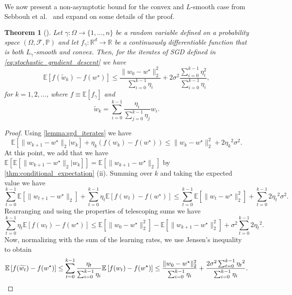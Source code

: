 \documentclass[12pt]{article}
\newtheorem{theorem}{Theorem}[section]
\theoremstyle{definition}
\numberwithin{equation}{section}
\newcommand{\R}{\mathbb{R}}
\newcommand{\E}{\mathbb{E}}
\newcommand{\BP}{\mathbb{P}}
\newcommand{\CF}{\mathcal{F}}
\newcommand{\ev}[1]{\mathbb{E}\left[{#1}\right]}
\newcommand{\norm}[1]{\lVert{#1}\rVert_2}
\begin{document}
We now present a non-asymptotic bound for the convex and $L$-smooth case from Sebbouh et al.\ \cite{sebbouhAlmostSureConvergence2021} and expand on some details of the proof.
\begin{theorem}[]
  \label{thm:SGD_bound}
  Let $\gamma : \Omega \rightarrow \{1,\dots,n\}$ be a random variable defined on a probability space $(\Omega, \CF, \BP)$ and let $f_{\gamma} : \R^d \rightarrow \R$ be a continuously differentiable function that is both $L_{\gamma}$-smooth and convex. Then, for the iterates of SGD defined in \eqref{eq:stochastic_gradient_descent} we have
  \begin{equation*}
    \ev{f(\widetilde{w}_k) - f(w^\star)} \leq \frac{\norm{w_{0} - w^\star}^2}{\sum_{i=0}^{k-1}\eta_i} + 2 \sigma^2 \frac{\sum_{i=0}^{k-1}\eta_i^2}{\sum_{i=0}^{k-1}\eta_i},
  \end{equation*}
  for $k = 1, 2, \dots$, where $f \equiv \ev{f_\gamma}$ and
  \begin{equation*}
    \widetilde{w}_k = \sum_{i=0}^{k-1}\frac{\eta_i}{\sum_{j=0}^{k-1}\eta_j}w_i.
  \end{equation*}
\end{theorem}
\begin{proof}
  Using \autoref{lemma:sgd_iterates} we have
  \begin{equation*}
    \E[\norm{w_{k+1} - w^\star}|w_k] + \eta_k (f(w_{k}) - f(w^\star)) \leq \norm{w_{k} - w^\star}^2 + 2{\eta_k}^2\sigma^2.
  \end{equation*}
  At this point, we add that we have $\ev{\E[\norm{w_{k+1} - w^\star}|w_k]} = \ev{\norm{w_{k+1} - w^\star}}$ by \autoref{thm:conditional_expectation} (ii).
  Summing over $k$ and taking the expected value we have
  \begin{equation*}
    \sum_{t=0}^{k-1}\ev{\norm{w_{t+1} - w^\star}} + \sum_{t=0}^{k-1} \eta_t \ev{f(w_{t}) - f(w^\star)} \leq \sum_{t=0}^{k-1} \ev{\norm{w_{t} - w^\star}^2} + \sum_{t=0}^{k-1} 2{\eta_t}^2\sigma^2.
  \end{equation*}
  Rearranging and using the properties of telescoping sums we have
  \begin{equation*}
    \sum_{t=0}^{k-1} \eta_t \ev{f(w_{t}) - f(w^\star)} \leq \ev{\norm{w_{0} - w^\star}^2} - \ev{\norm{w_{k+1} - w^\star}^2} + \sigma^2\sum_{t=0}^{k-1} 2{\eta_t}^2.
  \end{equation*}
  Now, normalizing with the sum of the learning rates, we use Jensen's inequality to obtain
  \begin{equation*}
    \ev{f(\widetilde{w_{t}}) - f(w^\star)} \leq \sum_{t=0}^{k-1} \frac{\eta_t}{\sum_{i=0}^{k-1}\eta_i} \ev{f(w_{t}) - f(w^\star)} \leq \frac{\norm{w_{0} - w^\star}^2}{\sum_{i=0}^{k-1}\eta_i} + \frac{2\sigma^2\sum_{t=0}^{k-1} {\eta_t}^2}{\sum_{i=0}^{k-1}\eta_i}. \qedhere
  \end{equation*}
\end{proof}
\end{document}
